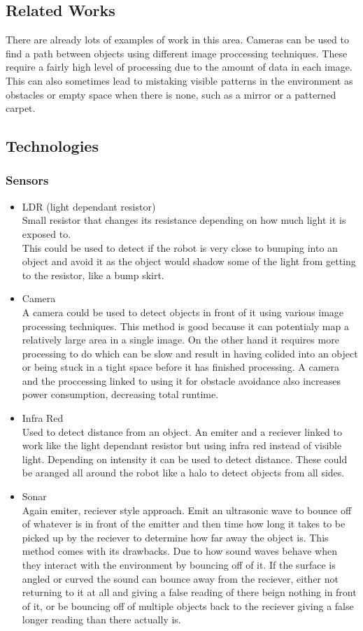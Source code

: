 \documentclass[11pt,fleqn,twoside]{article}
\begin{document}
\subsection{Related Works}
There are already lots of examples of work in this area.  Cameras can be used to find a path between objects using different image proccessing techniques.  These require a fairly high level of processing due to the amount of data in each image.  This can also sometimes lead to mistaking visible patterns in the environment as obstacles or empty space when there is none, such as a mirror or a patterned carpet. %
\cite{roborealm}
\subsection{Technologies}

\subsubsection{Sensors}
\begin{itemize}
\item LDR (light dependant resistor)
\\Small resistor that changes its resistance depending on how much light it is exposed to.
\\This could be used to detect if the robot is very close to bumping into an object and avoid it as the object would shadow some of the light from getting to the resistor, like a bump skirt.
\item Camera
\\A camera could be used to detect objects in front of it using various image processing techniques.  This method is good because it can potentialy map a relatively large area in a single image.  On the other hand it requires more processing to do which can be slow and result in having colided into an object or being stuck in a tight space before it has finished processing. A camera and the proccessing linked to using it for obstacle avoidance also increases power consumption, decreasing total runtime.
\item Infra Red
\\Used to detect distance from an object.  An emiter and a reciever linked to work like the light dependant resistor but using infra red instead of visible light.  Depending on intensity it can be used to detect distance.  These could be aranged all around the robot like a halo to detect objects from all sides.
\item Sonar
\\Again emiter, reciever style approach.  Emit an ultrasonic wave to bounce off of whatever is in  front of the emitter and then time how long it takes to be picked up by the reciever to determine how far away the object is.  This method comes with its drawbacks.  Due to how sound waves behave when they interact with the environment by bouncing off of it.  If the surface is angled or curved the sound can bounce away from the reciever, either not returning to it at all and giving a false reading of there beign nothing in front of it, or be bouncing off of multiple objects back to the reciever giving a false longer reading than there actually is.
\end{itemize}
\end{document}

